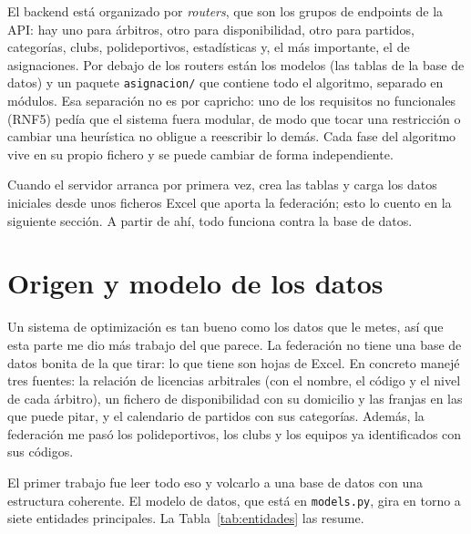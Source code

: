 \documentclass[11pt,a4paper,spanish]{book}
\numberwithin{equation}{chapter}
\numberwithin{figure}{chapter}
\numberwithin{table}{chapter}
\begin{document}
El backend está organizado por \emph{routers}, que son los grupos de endpoints de la API: hay uno para árbitros, otro para disponibilidad, otro para partidos, categorías, clubs, polideportivos, estadísticas y, el más importante, el de asignaciones. Por debajo de los routers están los modelos (las tablas de la base de datos) y un paquete \texttt{asignacion/} que contiene todo el algoritmo, separado en módulos. Esa separación no es por capricho: uno de los requisitos no funcionales (RNF5) pedía que el sistema fuera modular, de modo que tocar una restricción o cambiar una heurística no obligue a reescribir lo demás. Cada fase del algoritmo vive en su propio fichero y se puede cambiar de forma independiente.

Cuando el servidor arranca por primera vez, crea las tablas y carga los datos iniciales desde unos ficheros Excel que aporta la federación; esto lo cuento en la siguiente sección. A partir de ahí, todo funciona contra la base de datos.

\section{Origen y modelo de los datos}
\label{sec:datos}

Un sistema de optimización es tan bueno como los datos que le metes, así que esta parte me dio más trabajo del que parece. La federación no tiene una base de datos bonita de la que tirar: lo que tiene son hojas de Excel. En concreto manejé tres fuentes: la relación de licencias arbitrales (con el nombre, el código y el nivel de cada árbitro), un fichero de disponibilidad con su domicilio y las franjas en las que puede pitar, y el calendario de partidos con sus categorías. Además, la federación me pasó los polideportivos, los clubs y los equipos ya identificados con sus códigos.

El primer trabajo fue leer todo eso y volcarlo a una base de datos con una estructura coherente. El modelo de datos, que está en \texttt{models.py}, gira en torno a siete entidades principales. La Tabla~\ref{tab:entidades} las resume.
\end{document}
